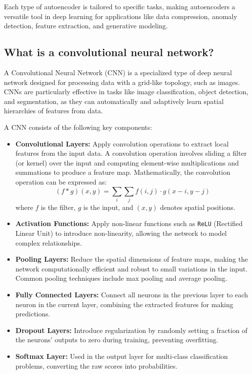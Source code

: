 Each type of autoencoder is tailored to specific tasks, making autoencoders a versatile tool in deep learning for applications like data compression, anomaly detection, feature extraction, and generative modeling.

\subsection{What is a convolutional neural network?}

A Convolutional Neural Network (CNN) is a specialized type of deep neural network designed for processing data with a grid-like topology, such as images. CNNs are particularly effective in tasks like image classification, object detection, and segmentation, as they can automatically and adaptively learn spatial hierarchies of features from data.

A CNN consists of the following key components:

\begin{itemize}
    \item \textbf{Convolutional Layers:} Apply convolution operations to extract local features from the input data. A convolution operation involves sliding a filter (or kernel) over the input and computing element-wise multiplications and summations to produce a feature map. Mathematically, the convolution operation can be expressed as:
    \[
    (f * g)(x, y) = \sum_{i} \sum_{j} f(i, j) \cdot g(x - i, y - j)
    \]
    where \( f \) is the filter, \( g \) is the input, and \((x, y)\) denotes spatial positions.

    \item \textbf{Activation Functions:} Apply non-linear functions such as \texttt{ReLU} (Rectified Linear Unit) to introduce non-linearity, allowing the network to model complex relationships.

    \item \textbf{Pooling Layers:} Reduce the spatial dimensions of feature maps, making the network computationally efficient and robust to small variations in the input. Common pooling techniques include max pooling and average pooling.

    \item \textbf{Fully Connected Layers:} Connect all neurons in the previous layer to each neuron in the current layer, combining the extracted features for making predictions.

    \item \textbf{Dropout Layers:} Introduce regularization by randomly setting a fraction of the neurons' outputs to zero during training, preventing overfitting.

    \item \textbf{Softmax Layer:} Used in the output layer for multi-class classification problems, converting the raw scores into probabilities.
\end{itemize}

